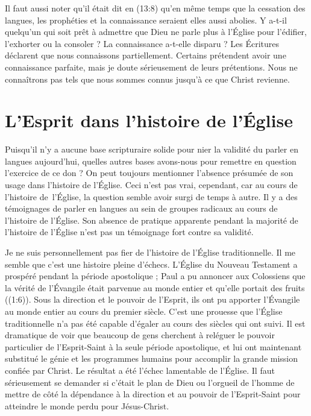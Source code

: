 Il faut aussi noter qu'il était dit en (13:8)
 qu'en même temps que la cessation des langues,
 les prophéties et la connaissance seraient elles aussi abolies.
 Y a-t-il quelqu'un qui soit prêt à admettre
 que Dieu ne parle plus à l'Église pour l'édifier, l'exhorter ou la consoler ?
 La connaissance a-t-elle disparu ? Les Écritures déclarent que nous
 connaissons partiellement. Certains prétendent avoir une connaissance
 parfaite, mais je doute sérieusement de leurs prétentions.
 Nous ne connaîtrons pas tels que nous sommes connus jusqu'à ce que Christ
 revienne.


\section{L'Esprit dans l'histoire de l'\'Eglise}

Puisqu'il n'y a aucune base scripturaire solide pour nier la validité
 du parler en langues aujourd'hui, quelles autres bases avons-nous
 pour remettre en question l'exercice de ce don ?
 On peut toujours mentionner
 l'absence présumée de son usage dans l'histoire de l'Église.
 Ceci n'est pas vrai, cependant, car au cours de l'histoire de~l'Église,
 la question semble avoir surgi de temps à autre.
 Il y a des témoignages de parler en langues au sein de groupes radicaux
 au cours de l'histoire de l'Église. Son absence de pratique apparente
 pendant la majorité de l'histoire de l'Église n'est pas un témoignage
 fort contre sa validité.

Je ne suis personnellement pas fier de l'histoire de l'Église traditionnelle.
 Il me semble que c'est une histoire pleine d'échecs. L'Église du Nouveau Testament
 a prospéré pendant la période apostolique ; Paul a pu annoncer aux
 Colossiens que la vérité de l'Évangile était parvenue au monde entier
 et qu'elle portait des fruits ((1:6)).
 Sous la direction et le pouvoir de l'Esprit, ils ont pu apporter l'Évangile
 au monde entier au cours du premier siècle. C'est une prouesse
 que l'Église traditionnelle n'a pas été capable d'égaler au cours
 des siècles qui ont suivi. Il est dramatique de voir que beaucoup de gens
 cherchent à reléguer le pouvoir particulier de l'Esprit-Saint à la seule période
 apostolique, et lui ont maintenant substitué le génie et les programmes
 humains pour accomplir la grande mission confiée par Christ.
 Le résultat a été l'échec lamentable de l'Église.
 Il faut sérieusement se demander si c'était le plan de Dieu ou l'orgueil
 de l'homme de mettre de côté la dépendance à la direction et au pouvoir
 de l'Esprit-Saint pour atteindre le monde perdu pour Jésus-Christ.


